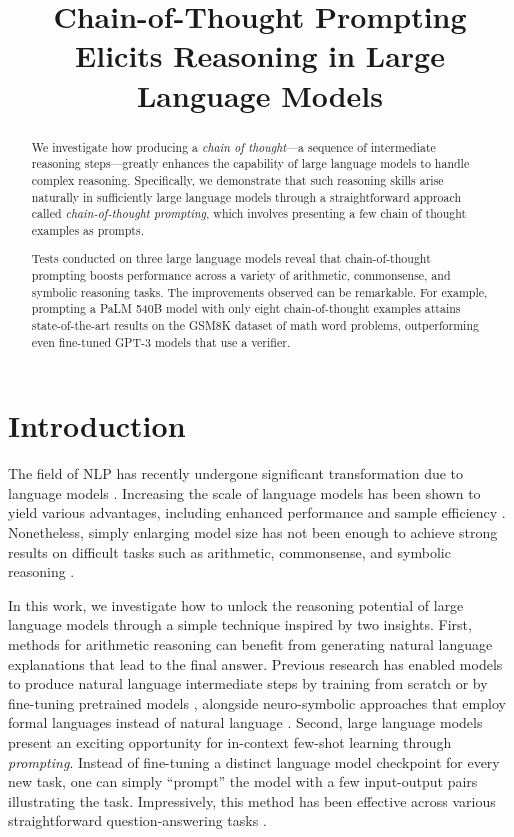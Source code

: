 \title{Chain-of-Thought Prompting Elicits Reasoning in Large Language Models}

\begin{abstract}
We investigate how producing a \textit{chain of thought}—a sequence of intermediate reasoning steps—greatly enhances the capability of large language models to handle complex reasoning. Specifically, we demonstrate that such reasoning skills arise naturally in sufficiently large language models through a straightforward approach called \textit{chain-of-thought prompting}, which involves presenting a few chain of thought examples as prompts.

Tests conducted on three large language models reveal that chain-of-thought prompting boosts performance across a variety of arithmetic, commonsense, and symbolic reasoning tasks. The improvements observed can be remarkable. For example, prompting a PaLM 540B model with only eight chain-of-thought examples attains state-of-the-art results on the GSM8K dataset of math word problems, outperforming even fine-tuned GPT-3 models that use a verifier.
\end{abstract}

\section{Introduction}
The field of NLP has recently undergone significant transformation due to language models \citep[][\textit{inter alia}]{peters-etal-2018-deep,devlin-etal-2019-bert,brown2020language}. Increasing the scale of language models has been shown to yield various advantages, including enhanced performance and sample efficiency \citep[\textit{inter alia}]{kaplan2020scaling,brown2020language}. Nonetheless, simply enlarging model size has not been enough to achieve strong results on difficult tasks such as arithmetic, commonsense, and symbolic reasoning \citep{rae2021scaling}.

In this work, we investigate how to unlock the reasoning potential of large language models through a simple technique inspired by two insights. First, methods for arithmetic reasoning can benefit from generating natural language explanations that lead to the final answer. Previous research has enabled models to produce natural language intermediate steps by training from scratch \citep{ling-etal-2017-program} or by fine-tuning pretrained models \citep{cobbe2021training}, alongside neuro-symbolic approaches that employ formal languages instead of natural language \citep{roy-roth-2015-solving, chiang-chen-2019-semantically,amini-etal-2019-mathqa, chen2019neural}. Second, large language models present an exciting opportunity for in-context few-shot learning through \emph{prompting}. Instead of fine-tuning a distinct language model checkpoint for every new task, one can simply ``prompt'' the model with a few input-output pairs illustrating the task. Impressively, this method has been effective across various straightforward question-answering tasks \citep{brown2020language}.

